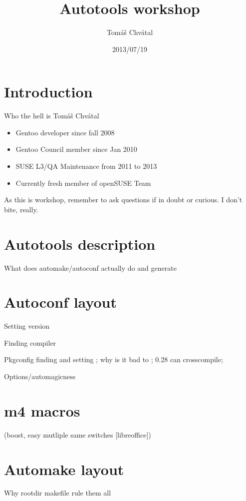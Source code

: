 \documentclass{beamer}
\author{Tom\'{a}\v{s} Chv\'{a}tal\newline {\small openSUSE Team}}
\title{Autotools workshop}
\date{2013/07/19}
\begin{document}
\begin{frame}[t,plain]
\titlepage
\end{frame}

\section{Introduction}

\begin{frame}{Who the hell is Tomáš Chvátal}
	\begin{itemize}
	\item Gentoo developer since fall 2008
	\item Gentoo Council member since Jan 2010
	\item SUSE L3/QA Maintenance from 2011 to 2013
	\item Currently fresh member of openSUSE Team
	\end{itemize}
	\begin{center}As this is workshop, remember to ask questions if in doubt or curious. I don't bite, really.\end{center}
\end{frame}

\section{Autotools description}

What does automake/autoconf actually do and generate

\section{Autoconf layout}

Setting version

Finding compiler

Pkgconfig finding and setting ; why is it bad to ; 0.28 can crosscompile;

Options/automagicness

\section{m4 macros}
(boost, easy mutliple same switches [libreoffice])

\section{Automake layout}

Why rootdir makefile rule them all
\end{document}

